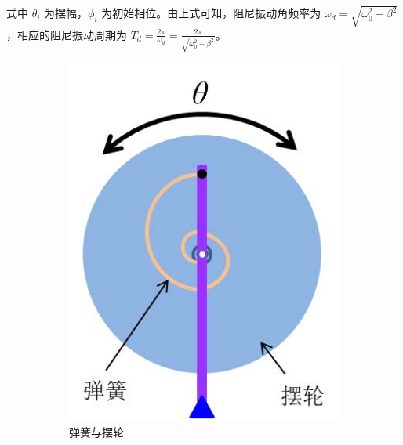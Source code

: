 \documentclass[12pt,a4paper]{amsart}
\begin{document}
式中 $\theta_i$ 为摆幅，$\phi_i$ 为初始相位。由上式可知，阻尼振动角频率为 $\omega_d = \sqrt{\omega_0^2 - \beta^2}$，相应的阻尼振动周期为 $T_d = \frac{2\pi}{\omega_d} = \frac{2\pi}{\sqrt{\omega_0^2 - \beta^2}}$。

\begin{figure}
    \centering
    \begin{subfigure}[b]{0.2475\linewidth}
        \centering
        \includegraphics[width=\linewidth]{img/1.jpg}
        \caption{弹簧与摆轮}
        \label{fig:1}
    \end{subfigure}
    \hfill
    \begin{subfigure}[b]{0.2475\linewidth}
        \centering

\end{subfigure}
\end{figure}
\end{document}
